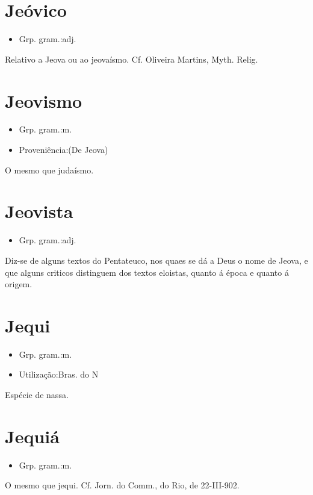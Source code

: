 \documentclass{article}
\begin{document}
\section{Jeóvico}
\begin{itemize}
\item {Grp. gram.:adj.}
\end{itemize}
Relativo a Jeova ou ao jeovaísmo. Cf. Oliveira Martins, \textunderscore Myth. Relig.\textunderscore 
\section{Jeovismo}
\begin{itemize}
\item {Grp. gram.:m.}
\end{itemize}
\begin{itemize}
\item {Proveniência:(De \textunderscore Jeova\textunderscore )}
\end{itemize}
O mesmo que \textunderscore judaísmo\textunderscore .
\section{Jeovista}
\begin{itemize}
\item {Grp. gram.:adj.}
\end{itemize}
Diz-se de alguns textos do \textunderscore Pentateuco\textunderscore , nos quaes se dá a Deus o nome de \textunderscore Jeova\textunderscore , e que alguns criticos distinguem dos textos eloistas, quanto á época e quanto á origem.
\section{Jequi}
\begin{itemize}
\item {Grp. gram.:m.}
\end{itemize}
\begin{itemize}
\item {Utilização:Bras. do N}
\end{itemize}
Espécie de nassa.
\section{Jequiá}
\begin{itemize}
\item {Grp. gram.:m.}
\end{itemize}
O mesmo que \textunderscore jequi\textunderscore . Cf. \textunderscore Jorn. do Comm.\textunderscore , do Rio, de 22-III-902.
\end{document}
